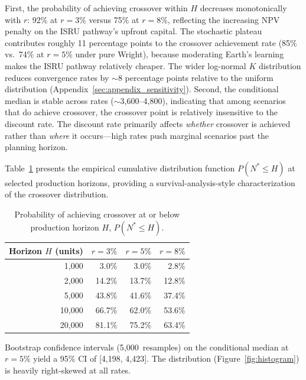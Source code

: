 \documentclass[preprint,12pt]{elsarticle}
\begin{document}
First, the probability of achieving crossover within $H$ decreases monotonically with $r$: 92\% at $r = 3\%$ versus 75\% at $r = 8\%$, reflecting the increasing NPV penalty on the ISRU pathway's upfront capital. The stochastic plateau contributes roughly 11 percentage points to the crossover achievement rate (85\% vs.\ 74\% at $r = 5\%$ under pure Wright), because moderating Earth's learning makes the ISRU pathway relatively cheaper. The wider log-normal $K$ distribution reduces convergence rates by $\sim$8 percentage points relative to the uniform distribution (Appendix~\ref{sec:appendix_sensitivity}). Second, the conditional median is stable across rates ($\sim$3{,}600--4{,}800), indicating that among scenarios that do achieve crossover, the crossover point is relatively insensitive to the discount rate. The discount rate primarily affects \emph{whether} crossover is achieved rather than \emph{where} it occurs---high rates push marginal scenarios past the planning horizon.

Table~\ref{tab:convergence} presents the empirical cumulative distribution function $P(N^* \leq H)$ at selected production horizons, providing a survival-analysis-style characterization of the crossover distribution.

\begin{table}[htbp]
\centering
\caption{Probability of achieving crossover at or below production horizon $H$, $P(N^* \leq H)$.}
\label{tab:convergence}
\small
\begin{tabular}{@{}rrrr@{}}
\toprule
Horizon $H$ (units) & $r = 3\%$ & $r = 5\%$ & $r = 8\%$ \\
\midrule
1{,}000  & 3.0\% & 3.0\% & 2.8\% \\
2{,}000  & 14.2\% & 13.7\% & 12.8\% \\
5{,}000  & 43.8\% & 41.6\% & 37.4\% \\
10{,}000 & 66.7\% & 62.0\% & 53.6\% \\
20{,}000 & 81.1\% & 75.2\% & 63.4\% \\
\bottomrule
\end{tabular}
\end{table}

Bootstrap confidence intervals (5{,}000~resamples) on the conditional median at $r = 5\%$ yield a 95\% CI of [4{,}198, 4{,}423]. The distribution (Figure~\ref{fig:histogram}) is heavily right-skewed at all rates.
\end{document}
